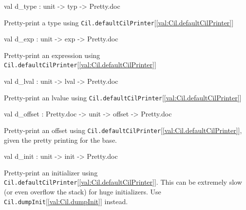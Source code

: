 \documentclass[11pt]{article}
\begin{document}
\label{val:Cil.d-underscoretype}\begin{ocamldoccode}
val d_type : unit -> typ -> Pretty.doc
\end{ocamldoccode}
\begin{ocamldocdescription}
Pretty-print a type using {\tt{Cil.defaultCilPrinter}}[\ref{val:Cil.defaultCilPrinter}]


\end{ocamldocdescription}




\label{val:Cil.d-underscoreexp}\begin{ocamldoccode}
val d_exp : unit -> exp -> Pretty.doc
\end{ocamldoccode}
\begin{ocamldocdescription}
Pretty-print an expression using {\tt{Cil.defaultCilPrinter}}[\ref{val:Cil.defaultCilPrinter}]


\end{ocamldocdescription}




\label{val:Cil.d-underscorelval}\begin{ocamldoccode}
val d_lval : unit -> lval -> Pretty.doc
\end{ocamldoccode}
\begin{ocamldocdescription}
Pretty-print an lvalue using {\tt{Cil.defaultCilPrinter}}[\ref{val:Cil.defaultCilPrinter}]


\end{ocamldocdescription}




\label{val:Cil.d-underscoreoffset}\begin{ocamldoccode}
val d_offset : Pretty.doc -> unit -> offset -> Pretty.doc
\end{ocamldoccode}
\begin{ocamldocdescription}
Pretty-print an offset using {\tt{Cil.defaultCilPrinter}}[\ref{val:Cil.defaultCilPrinter}], given the pretty 
 printing for the base.


\end{ocamldocdescription}




\label{val:Cil.d-underscoreinit}\begin{ocamldoccode}
val d_init : unit -> init -> Pretty.doc
\end{ocamldoccode}
\begin{ocamldocdescription}
Pretty-print an initializer using {\tt{Cil.defaultCilPrinter}}[\ref{val:Cil.defaultCilPrinter}].  This can be 
 extremely slow (or even overflow the stack) for huge initializers. Use 
 {\tt{Cil.dumpInit}}[\ref{val:Cil.dumpInit}] instead.


\end{ocamldocdescription}
\end{document}
